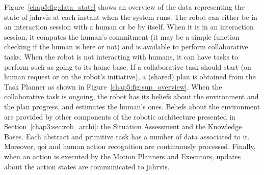 \documentclass[a4paper,11pt,twoside]{StyleThese}
\begin{document}
Figure~\ref{chap5:fig:data_state} shows an overview of the data representing the state of \acrshort{jahrvis} at each instant when the system runs. The robot can either be in an interaction session with a human or be by itself. When it is in an interaction session, it computes the human's commitment (it may be a simple function checking if the human is here or not) and is available to perform collaborative tasks. When the robot is not interacting with humans, it can have tasks to perform such as going to its home base. If a collaborative task should start (on human request or on the robot's initiative), a (shared) plan is obtained from the Task Planner as shown in Figure~\ref{chap5:fig:sup_overview}. When the collaborative task is ongoing, the robot has its beliefs about the environment and the plan progress, and estimates the human's ones. Beliefs about the environment are provided by other components of the robotic architecture presented in Section~\ref{chap3:sec:rob_archi}: the Situation Assessment and the Knowledge Bases. Each abstract and primitive task has a number of data associated to it. Moreover, \acrlong{qoi} and human action recognition are continuously processed. Finally, when an action is executed by the Motion Planners and Executors, updates about the action states are communicated to \acrshort{jahrvis}.
\end{document}
